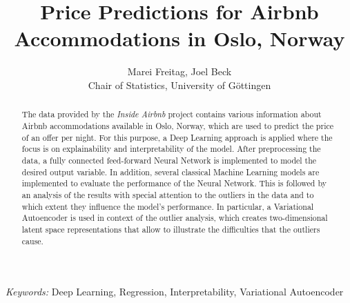 \begin{titlepage}

    \title{\bf Price Predictions for Airbnb Accommodations in Oslo, Norway}

    \author{Marei Freitag, Joel Beck \hspace{.2cm}\\ Chair of Statistics, University of G\"ottingen\\}

    \maketitle

    \bigskip

    \begin{abstract}
        \noindent The data provided by the \emph{Inside Airbnb} project contains various information about Airbnb accommodations available in Oslo, Norway, which are used to predict the price of an offer per night.
        For this purpose, a Deep Learning approach is applied where the focus is on explainability and interpretability of the model. After preprocessing the data, a fully connected feed-forward Neural Network is implemented to model the desired output variable.
        In addition, several classical Machine Learning models are implemented to evaluate the performance of the Neural Network.
        This is followed by an analysis of the results with special attention to the outliers in the data and to which extent they influence the model's performance.
        In particular, a Variational Autoencoder is used in context of the outlier
        analysis, which creates two-dimensional latent space representations that allow to illustrate the difficulties that the outliers cause.
    \end{abstract}

    \noindent%
    {\it Keywords:}  Deep Learning, Regression, Interpretability, Variational Autoencoder
    \vfill

\end{titlepage}

